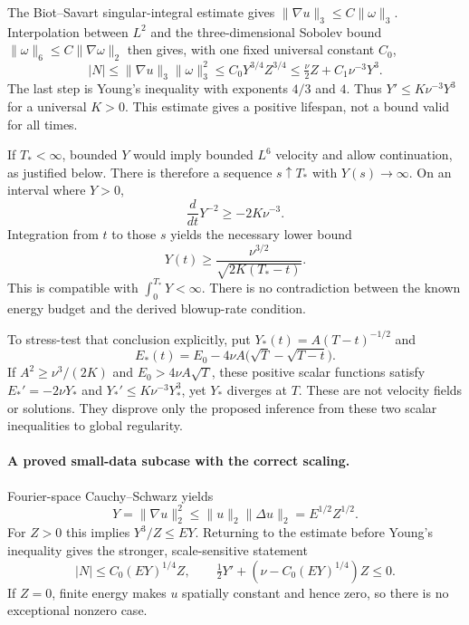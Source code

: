 \documentclass[11pt]{article}
\begin{document}
The Biot--Savart singular-integral estimate gives
 $\|\nabla u\|_3\leq C\|\omega\|_3$. Interpolation between $L^2$ and the
 three-dimensional Sobolev bound $\|\omega\|_6\leq C\|\nabla\omega\|_2$
 then gives, with one fixed universal constant $C_0$,
\begin{equation}\label{ns:stretch}
 |N|\leq\|\nabla u\|_3\|\omega\|_3^2
 \leq C_0Y^{3/4}Z^{3/4}
 \leq\tfrac\nu2 Z+C_1\nu^{-3}Y^3.
\end{equation}
The last step is Young's inequality with exponents $4/3$ and $4$.
 Thus $Y'\leq K\nu^{-3}Y^3$ for a universal $K>0$.
 This estimate gives a positive lifespan, not a bound valid for all times.

If $T_*<\infty$, bounded $Y$ would imply bounded $L^6$ velocity and allow
 continuation, as justified below. There is therefore a sequence
 $s\uparrow T_*$ with $Y(s)\to\infty$. On an interval where $Y>0$,
\[
 \frac d{dt}Y^{-2}\geq-2K\nu^{-3}.
\]
Integration from $t$ to those $s$ yields the necessary lower bound
\begin{equation}\label{ns:rate}
 Y(t)\geq\frac{\nu^{3/2}}{\sqrt{2K(T_*-t)}}.
\end{equation}
This is compatible with $\int_0^{T_*}Y<\infty$. There is no contradiction
 between the known energy budget and the derived blowup-rate condition.

To stress-test that conclusion explicitly, put
 $Y_*(t)=A(T-t)^{-1/2}$ and
\[
 E_*(t)=E_0-4\nu A\bigl(\sqrt T-\sqrt{T-t}\bigr).
\]
If $A^2\geq\nu^3/(2K)$ and $E_0>4\nu A\sqrt T$, these positive scalar
 functions satisfy $E_*'=-2\nu Y_*$ and
 $Y_*'\leq K\nu^{-3}Y_*^3$, yet $Y_*$ diverges at $T$. These are not
 velocity fields or solutions. They disprove only the proposed inference
 from these two scalar inequalities to global regularity.

\paragraph{A proved small-data subcase with the correct scaling.}
Fourier-space Cauchy--Schwarz yields
\[
 Y=\|\nabla u\|_2^2\leq\|u\|_2\|\Delta u\|_2=E^{1/2}Z^{1/2}.
\]
For $Z>0$ this implies $Y^3/Z\leq EY$. Returning to the estimate before
 Young's inequality gives the stronger, scale-sensitive statement
\begin{equation}\label{ns:invariant}
 |N|\leq C_0(EY)^{1/4}Z,
 \qquad
 \tfrac12Y'+\left(\nu-C_0(EY)^{1/4}\right)Z\leq0.
\end{equation}
If $Z=0$, finite energy makes $u$ spatially constant and hence zero, so
 there is no exceptional nonzero case.
\end{document}
